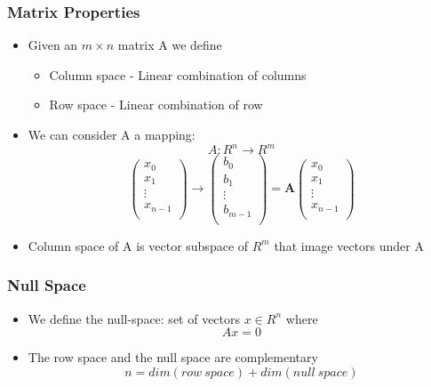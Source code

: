 \documentclass[10pt]{beamer}
\begin{document}
\begin{frame}
  \frametitle{Matrix Properties}
  \begin{itemize}
  \item Given an $m \times n$ matrix A we define
    \begin{itemize}
    \item Column space - Linear combination of columns
    \item Row space - Linear combination of row
    \end{itemize}
  \item We can consider A a mapping:
    \[
      A: R^n \rightarrow R^m
    \]
    \[
      \left(
        \begin{array}{c}
          x_0 \\ x_1 \\ \vdots \\ x_{n-1} \\
        \end{array}
      \right) \rightarrow
      \left(
        \begin{array}{c}
          b_0 \\ b_1 \\ \vdots \\ b_{m-1} \\
        \end{array}
      \right) =
      \mathbf{A}
      \left(
        \begin{array}{c}
          x_0 \\ x_1 \\ \vdots \\ x_{n-1} \\
        \end{array}
      \right)
    \]
  \item Column space of A is vector subspace of $R^m$ that image
    vectors under A
  \end{itemize}
\end{frame}

\begin{frame}
  \frametitle{Null Space}
  \begin{itemize}
  \item We define the null-space: set of vectors $x \in R^n$ where
    \[
      A x = 0
    \]
  \item The row space and the null space are complementary
    \[
      n = dim(row~space) + dim(null~space)
    \]
  \end{itemize}
\end{frame}
\end{document}
